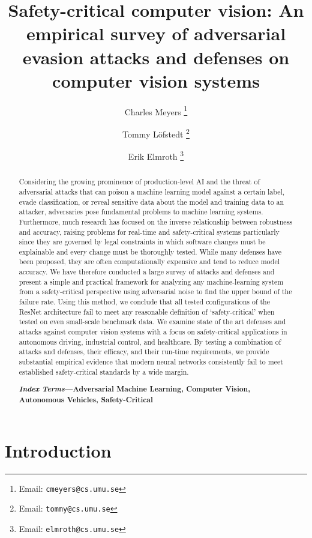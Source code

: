 \documentclass[journal]{IEEEtran}
\title{Safety-critical computer vision: An empirical survey of adversarial evasion attacks and defenses on computer vision systems}
\author[1]{Charles Meyers%
  \thanks{Email: \texttt{cmeyers@cs.umu.se}}}
\author[1]{Tommy L\"{o}fstedt%
  \thanks{Email: \texttt{tommy@cs.umu.se}}}
\author[1]{Erik Elmroth%
  \thanks{Email: \texttt{elmroth@cs.umu.se}}}
\affil[1]{Department of Computing Science, Umeå University, Umeå, Sweden}
\begin{document}
\maketitle
\begin{abstract}

Considering the growing prominence of production-level AI and the threat of adversarial attacks that can poison a machine learning model against a certain label, evade classification, or reveal sensitive data about the model and training data to an attacker, adversaries pose fundamental problems to machine learning systems. Furthermore, much research has focused on the inverse relationship between robustness and accuracy, raising problems for real-time and safety-critical systems particularly since they are governed by legal constraints in which software changes must be explainable and every change must be thoroughly tested. While many defenses have been proposed, they are often computationally expensive and tend to reduce model accuracy. We have therefore conducted a large survey of attacks and defenses and present a simple and practical framework for analyzing any machine-learning system from a safety-critical perspective using adversarial noise to find the upper bound of the failure rate. Using this method, we conclude that all tested configurations of the ResNet architecture fail to meet any reasonable definition of `safety-critical' when tested on even small-scale benchmark data. We examine state of the art defenses and attacks against computer vision systems with a focus on safety-critical applications in autonomous driving, industrial control, and healthcare. By testing a combination of attacks and defenses, their efficacy, and their run-time requirements, we provide substantial empirical evidence that modern neural networks consistently fail to meet established safety-critical standards by a wide margin.

\textbf{\textit{Index Terms}---Adversarial Machine Learning, Computer Vision, Autonomous Vehicles, Safety-Critical}

\end{abstract}


\section{Introduction}
\end{document}
